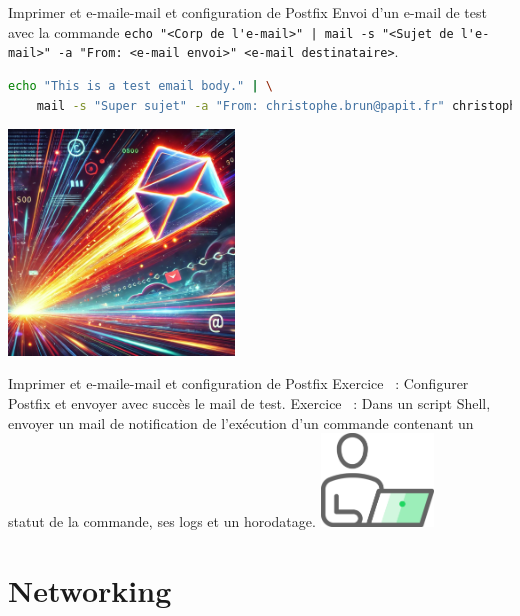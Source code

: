 \documentclass{beamer}
\begin{document}
    \begin{frame}[fragile]{Imprimer et e-mail}{e-mail et configuration de Postfix}
        Envoi d'un e-mail de test avec la commande \lstinline{echo "<Corp de l'e-mail>" | mail -s "<Sujet de l'e-mail>" -a "From: <e-mail envoi>" <e-mail destinataire>}.
        \begin{lstlisting}[language=bash]
echo "This is a test email body." | \
    mail -s "Super sujet" -a "From: christophe.brun@papit.fr" christophe.brun@papit.fr
        \end{lstlisting}
        \begin{center}
            \includegraphics[width=6cm]{image/sendmail}
        \end{center}
    \end{frame}

    \begin{frame}{Imprimer et e-mail}{e-mail et configuration de Postfix}
        Exercice \execcounterdispinc~:
        Configurer Postfix et envoyer avec succès le mail de test.
        \bigbreak
        Exercice \execcounterdispinc~:
        Dans un script Shell, envoyer un mail de notification de l'exécution d'un commande contenant un statut de la commande, ses logs et un horodatage.
        \bigbreak
        \centering
        \includegraphics[width=3cm]{image/guy-in-front-of-desktop}
    \end{frame}


    \section{Networking}\label{sec:networking}
\end{document}

